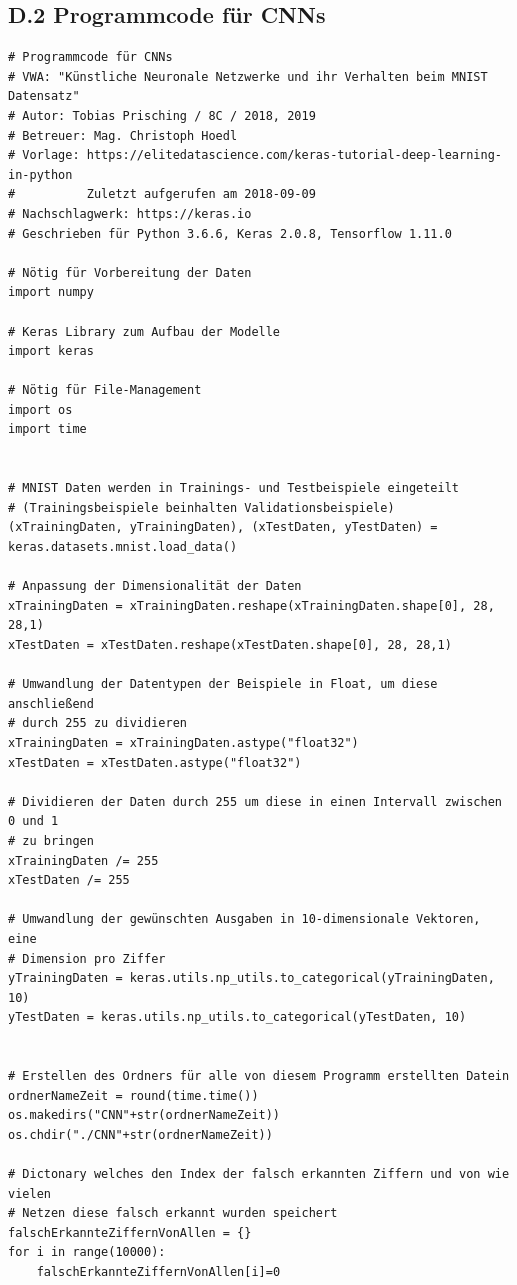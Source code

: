 \documentclass[a4paper,12pt,ngerman,oneside]{scrreprt}	%
\begin{document}
		\subsection*{D.2 Programmcode für CNNs}
		{\renewcommand*{\ttdefault}{txtt}
			\begin{lstlisting}
# Programmcode für CNNs
# VWA: "Künstliche Neuronale Netzwerke und ihr Verhalten beim MNIST Datensatz"
# Autor: Tobias Prisching / 8C / 2018, 2019
# Betreuer: Mag. Christoph Hoedl
# Vorlage: https://elitedatascience.com/keras-tutorial-deep-learning-in-python
#          Zuletzt aufgerufen am 2018-09-09
# Nachschlagwerk: https://keras.io
# Geschrieben für Python 3.6.6, Keras 2.0.8, Tensorflow 1.11.0

# Nötig für Vorbereitung der Daten
import numpy

# Keras Library zum Aufbau der Modelle
import keras

# Nötig für File-Management
import os
import time


# MNIST Daten werden in Trainings- und Testbeispiele eingeteilt
# (Trainingsbeispiele beinhalten Validationsbeispiele)
(xTrainingDaten, yTrainingDaten), (xTestDaten, yTestDaten) = keras.datasets.mnist.load_data()

# Anpassung der Dimensionalität der Daten
xTrainingDaten = xTrainingDaten.reshape(xTrainingDaten.shape[0], 28, 28,1)
xTestDaten = xTestDaten.reshape(xTestDaten.shape[0], 28, 28,1)

# Umwandlung der Datentypen der Beispiele in Float, um diese anschließend
# durch 255 zu dividieren
xTrainingDaten = xTrainingDaten.astype("float32")
xTestDaten = xTestDaten.astype("float32")

# Dividieren der Daten durch 255 um diese in einen Intervall zwischen 0 und 1
# zu bringen
xTrainingDaten /= 255
xTestDaten /= 255

# Umwandlung der gewünschten Ausgaben in 10-dimensionale Vektoren, eine
# Dimension pro Ziffer
yTrainingDaten = keras.utils.np_utils.to_categorical(yTrainingDaten, 10)
yTestDaten = keras.utils.np_utils.to_categorical(yTestDaten, 10)


# Erstellen des Ordners für alle von diesem Programm erstellten Datein
ordnerNameZeit = round(time.time())
os.makedirs("CNN"+str(ordnerNameZeit))
os.chdir("./CNN"+str(ordnerNameZeit))

# Dictonary welches den Index der falsch erkannten Ziffern und von wie vielen
# Netzen diese falsch erkannt wurden speichert
falschErkannteZiffernVonAllen = {}
for i in range(10000):
	falschErkannteZiffernVonAllen[i]=0



\end{lstlisting}}
\end{document}

